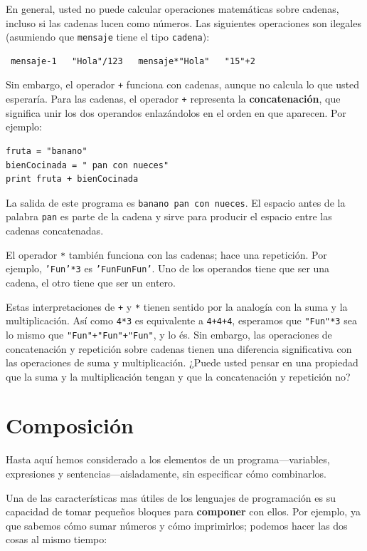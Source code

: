 En general, usted no puede calcular operaciones matemáticas sobre cadenas,
incluso si las cadenas lucen como números. Las siguientes operaciones son 
ilegales (asumiendo que \texttt{mensaje} tiene el tipo \texttt{cadena}):

\beforeverb
\begin{verbatim}
 mensaje-1   "Hola"/123   mensaje*"Hola"   "15"+2
\end{verbatim}
\afterverb
%
Sin embargo, el operador \texttt{+} funciona con cadenas, aunque no calcula lo
que usted esperaría.  Para las cadenas, el operador \texttt{+}
representa la {\bf concatenación}, que significa unir los dos operandos 
enlazándolos en el orden en que aparecen. Por ejemplo:


\beforeverb
\begin{verbatim}
fruta = "banano"
bienCocinada = " pan con nueces"
print fruta + bienCocinada
\end{verbatim}
\afterverb
%
La salida de este programa es  \texttt{banano pan con nueces}. El espacio
antes de la palabra \texttt{pan} es parte de la cadena y sirve para
producir el espacio entre las cadenas concatenadas.

El operador \texttt{*} también funciona con las cadenas; hace una repetición.
Por ejemplo, \texttt{'Fun'*3} es \texttt{'FunFunFun'}.  Uno de los operandos tiene que ser una cadena, el otro tiene que ser un entero.

Estas interpretaciones de \texttt{+} y \texttt{*} tienen sentido por la analogía
 con la suma y la  multiplicación.  Así como \texttt{4*3} es
equivalente a \texttt{4+4+4}, esperamos que \texttt{"Fun"*3} sea lo mismo que
{\verb/"Fun"+"Fun"+"Fun"/}, y lo és.  Sin embargo, las operaciones de concatenación y repetición 
sobre cadenas tienen una diferencia
significativa con las operaciones de suma y multiplicación.
¿Puede usted pensar en una propiedad que la suma y la multiplicación tengan
y que la concatenación y repetición no?



\section{Composición}


Hasta aquí hemos considerado a los elementos de un programa---variables,
expresiones y sentencias---aisladamente, sin especificar cómo combinarlos.

Una de las características mas útiles de los lenguajes de programación es
su capacidad de tomar pequeños bloques para  {\bf componer} con ellos.  Por
ejemplo, ya que sabemos cómo sumar números y cómo imprimirlos; podemos hacer
las dos cosas al mismo tiempo:

